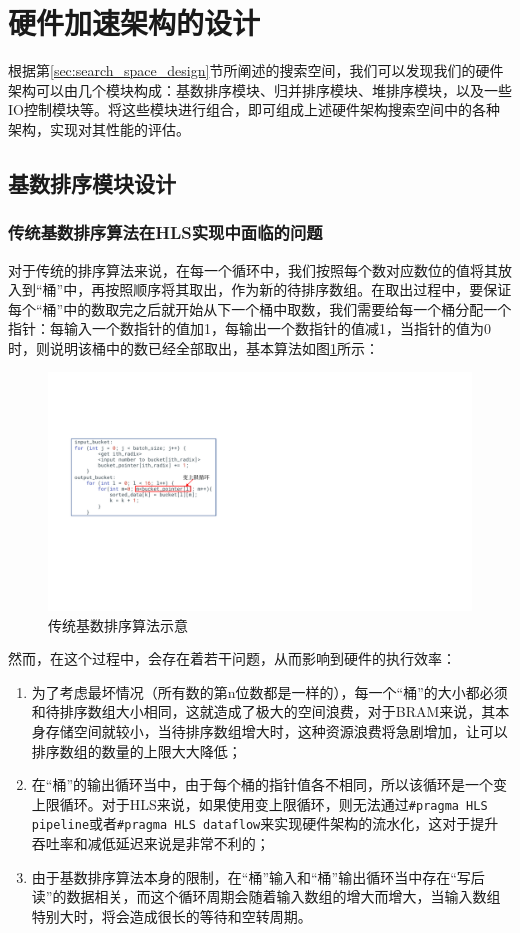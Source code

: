 \section{硬件加速架构的设计}

根据第\ref{sec:search_space_design}节所阐述的搜索空间，我们可以发现我们的硬件架构可以由几个模块构成：基数排序模块、归并排序模块、堆排序模块，以及一些IO控制模块等。将这些模块进行组合，即可组成上述硬件架构搜索空间中的各种架构，实现对其性能的评估。
\subsection{基数排序模块设计}
\subsubsection{传统基数排序算法在HLS实现中面临的问题}
对于传统的排序算法来说，在每一个循环中，我们按照每个数对应数位的值将其放入到“桶”中，再按照顺序将其取出，作为新的待排序数组。在取出过程中，要保证每个“桶”中的数取完之后就开始从下一个桶中取数，我们需要给每一个桶分配一个指针：每输入一个数指针的值加1，每输出一个数指针的值减1，当指针的值为0时，则说明该桶中的数已经全部取出，基本算法如图\ref{fig:traditional_radix_sort}所示：
\begin{figure}[htbp]
    \centering
    \includegraphics[width=12cm]{figures/traditional_radix_sort_algorithm.pdf}
    \caption{传统基数排序算法示意}
    \label{fig:traditional_radix_sort}
\end{figure}

然而，在这个过程中，会存在着若干问题，从而影响到硬件的执行效率：
\begin{enumerate}
    \item 为了考虑最坏情况（所有数的第n位数都是一样的），每一个“桶”的大小都必须和待排序数组大小相同，这就造成了极大的空间浪费，对于BRAM来说，其本身存储空间就较小，当待排序数组增大时，这种资源浪费将急剧增加，让可以排序数组的数量的上限大大降低；
    \item 在“桶”的输出循环当中，由于每个桶的指针值各不相同，所以该循环是一个变上限循环。对于HLS来说，如果使用变上限循环，则无法通过\verb|#pragma HLS pipeline|或者\verb|#pragma HLS dataflow|来实现硬件架构的流水化，这对于提升吞吐率和减低延迟来说是非常不利的；
    \item 由于基数排序算法本身的限制，在“桶”输入和“桶”输出循环当中存在“写后读”的数据相关，而这个循环周期会随着输入数组的增大而增大，当输入数组特别大时，将会造成很长的等待和空转周期。
\end{enumerate}


